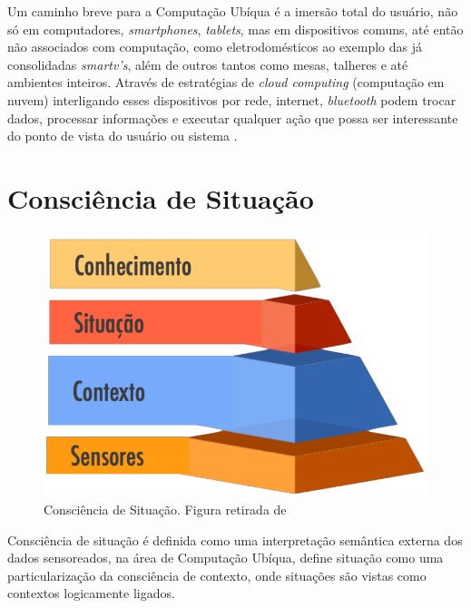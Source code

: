 \documentclass[12pt,a4paper,compsoc]{IEEEtran}
\begin{document}
  Um caminho breve para a Computação Ubíqua é a imersão total do usuário, não só em computadores,
  \textit{smartphones}, \textit{tablets}, mas em dispositivos comuns, até então não associados com
  computação, como eletrodomésticos ao exemplo das já consolidadas \textit{smartv's}, além de
  outros tantos como mesas, talheres e até ambientes inteiros. Através de estratégias de
  \textit{cloud computing} (computação em nuvem) interligando esses dispositivos por rede,
  internet, \textit{bluetooth} podem trocar dados, processar informações e executar qualquer ação
  que possa ser interessante do ponto de vista do usuário ou sistema \cite{weiser1993}.
  

\section{Consciência de Situação}

  \begin{figure}[ht]
  \centerline{\includegraphics[scale=.20]{imagens/consciencia-de-situacao-piramide.png}}
  \caption{Consciência de Situação. Figura retirada de \cite{almeida2013}}
  \label{cs-piramide}
  \end{figure}

  Consciência de situação é definida como uma interpretação semântica externa dos dados 
  sensoreados, na área de Computação Ubíqua, \cite{anagnostopoulos2006} define situação como uma 
  particularização da consciência de contexto, onde situações são vistas como contextos logicamente
  ligados.
  
\end{document}
